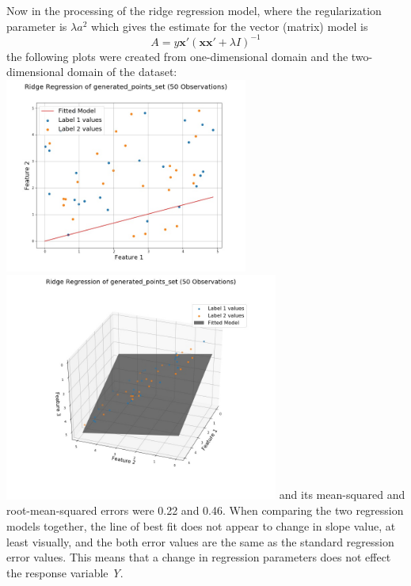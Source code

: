 \documentclass[a4paper,12pt]{IEEEtran}
\begin{document}
Now in the processing of the ridge regression model, where the regularization parameter is $\lambda \textit{a}^{2}$ which gives the estimate for the vector (matrix) model is
$$\textit{A} = \textit{y}\textbf{x}'(\textbf{x}\textbf{x}' + \lambda \textit{I})^{-1}$$the following plots were created from one-dimensional domain and the two-dimensional domain of the dataset: \includegraphics[width=8cm]{ridge_reg_1d_generated_points_set} \includegraphics[width=9cm]{ridge_reg_2d_generated_points_set} and its mean-squared and root-mean-squared errors were 0.22 and 0.46. When comparing the two regression models together, the line of best fit does not appear to change in slope value, at least visually, and the both error values are the same as the standard regression error values. This means that a change in regression parameters does not effect the response variable \textit{Y}.
\end{document}
